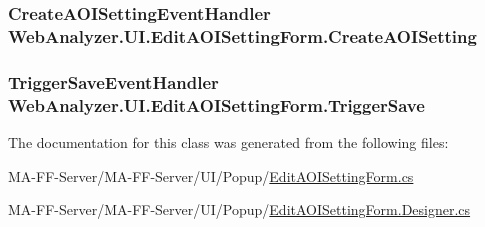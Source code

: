 \subsubsection[{Create\+A\+O\+I\+Setting}]{\setlength{\rightskip}{0pt plus 5cm}Create\+A\+O\+I\+Setting\+Event\+Handler Web\+Analyzer.\+U\+I.\+Edit\+A\+O\+I\+Setting\+Form.\+Create\+A\+O\+I\+Setting}\label{class_web_analyzer_1_1_u_i_1_1_edit_a_o_i_setting_form_a1841845af65ba0e224742710ddefb772}
\hypertarget{class_web_analyzer_1_1_u_i_1_1_edit_a_o_i_setting_form_a5333229783b91948ba94f0ed0a947c6d}{}
\subsubsection[{Trigger\+Save}]{\setlength{\rightskip}{0pt plus 5cm}Trigger\+Save\+Event\+Handler Web\+Analyzer.\+U\+I.\+Edit\+A\+O\+I\+Setting\+Form.\+Trigger\+Save}\label{class_web_analyzer_1_1_u_i_1_1_edit_a_o_i_setting_form_a5333229783b91948ba94f0ed0a947c6d}


The documentation for this class was generated from the following files\+:\begin{DoxyCompactItemize}
\item 
M\+A-\/\+F\+F-\/\+Server/\+M\+A-\/\+F\+F-\/\+Server/\+U\+I/\+Popup/\hyperlink{_edit_a_o_i_setting_form_8cs}{Edit\+A\+O\+I\+Setting\+Form.\+cs}\item 
M\+A-\/\+F\+F-\/\+Server/\+M\+A-\/\+F\+F-\/\+Server/\+U\+I/\+Popup/\hyperlink{_edit_a_o_i_setting_form_8_designer_8cs}{Edit\+A\+O\+I\+Setting\+Form.\+Designer.\+cs}\end{DoxyCompactItemize}
